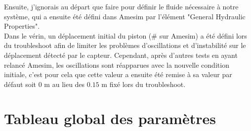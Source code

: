 \documentclass[a4paper,12pt,calibri,oneside,openany]{book}
\theoremstyle{break}
\begin{document}
Ensuite, j'ignorais au départ que faire pour définir le fluide nécessaire à notre système, qui a ensuite été défini dans Amesim par l'élément "General Hydraulic Properties".\\

Dans le vérin, un déplacement initial du piston ($\#$ sur Amesim) a été défini lors du troubleshoot afin de limiter les problèmes d'oscillations et d'instabilité sur le déplacement détecté par le capteur. Cependant, après d'autres tests en ayant relancé Amesim, les oscillations sont réapparues avec la nouvelle condition initiale, c'est pour cela que cette valeur a ensuite été remise à sa valeur par défaut soit $0$ m au lieu des $0.15$ m fixé lors du troubleshoot.
\clearpage
{}
\section{Tableau global des paramètres}
\end{document}

